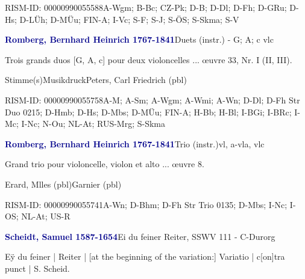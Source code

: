 \documentclass[twocolumn, 12pt]{book}
\begin{document}
\par RISM-ID: 00000990055588\newline A-Wgm; B-Bc; CZ-Pk; D-B; D-Dl; D-Fh; D-GRu; D-Hs; D-LÜh; D-MÜu; FIN-A; I-Vc; S-F; S-J; S-ÖS; S-Skma; S-V
\par \vspace{16pt} \textcolor{darkblue}{\textbf{Romberg, Bernhard Heinrich  1767-1841}}\hfillplus{\textbf{[324]}}\newline Duets (instr.) - G; A; c vlc
\par \begin{itshape}Trois grands duos [G, A, c] pour deux violoncelles ... œuvre 33, Nr. I (II, III).\end{itshape} 
\par \textcolor{darkblue}{}  Stimme(s)\newline Musikdruck\newline Peters, Carl Friedrich  (pbl)
\par RISM-ID: 00000990055758\newline A-M; A-Sm; A-Wgm; A-Wmi; A-Wn; D-Dl; D-Fh  Str Duo 0215; D-Hmb; D-Hs; D-Mbs; D-MÜu; FIN-A; H-Bb; H-Bl; I-BGi; I-BRc; I-Mc; I-Nc; N-Ou; NL-At; RUS-Mrg; S-Skma
\par \vspace{16pt} \textcolor{darkblue}{\textbf{Romberg, Bernhard Heinrich  1767-1841}}\hfillplus{\textbf{[325]}}\newline Trio (instr.)\newline vl, a-vla, vlc
\par \begin{itshape}Grand trio pour violoncelle, violon et alto ... œuvre 8.\end{itshape} \newline Erard, Mlles  (pbl)\newline Garnier  (pbl)
\par RISM-ID: 00000990055741\newline A-Wn; D-Bhm; D-Fh  Str Trio 0135; D-Mbs; I-Nc; I-OS; NL-At; US-R
\par \vspace{16pt} \textcolor{darkblue}{\textbf{Scheidt, Samuel  1587-1654}}\hfillplus{\textbf{[326]}}\newline Ei du feiner Reiter, SSWV 111 - C-Dur\newline org
\par \begin{itshape}[f.91v, at left:] Eÿ du feiner | Reiter | [at the beginning of the variation:] Variatio | c[on]tra punct | S. Scheid.\end{itshape} 
\end{document}
